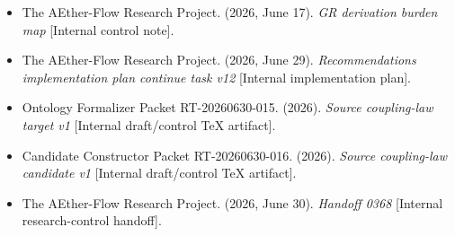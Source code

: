 \documentclass[11pt]{article}
\begin{document}
\begin{itemize}
\item The AEther-Flow Research Project. (2026, June 17). \textit{GR derivation burden map} [Internal control note].
\item The AEther-Flow Research Project. (2026, June 29). \textit{Recommendations implementation plan continue task v12} [Internal implementation plan].
\item Ontology Formalizer Packet RT-20260630-015. (2026). \textit{Source coupling-law target v1} [Internal draft/control TeX artifact].
\item Candidate Constructor Packet RT-20260630-016. (2026). \textit{Source coupling-law candidate v1} [Internal draft/control TeX artifact].
\item The AEther-Flow Research Project. (2026, June 30). \textit{Handoff 0368} [Internal research-control handoff].
\end{itemize}
\end{document}
